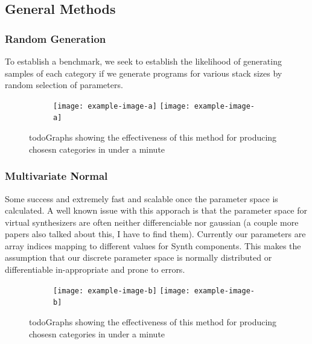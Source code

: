 \documentclass{nime-alternate} %
\begin{document}
\subsection{General Methods}
\subsubsection{Random Generation}
To establish a benchmark, we seek to establish the likelihood of generating samples of each category if we generate programs for various stack sizes by random selection of parameters. \\
\begin{figure}[H]
\centering
\begin{subfigure}[b]{\linewidth}
\texttt{[image: example-image-a]}
\texttt{[image: example-image-a]}
\label{fig:1stack}
\setcounter{subfigure}{2}%
\end{subfigure}
\caption{\colorbox{green!=40}{todo}Graphs showing the effectiveness of this method for producing chosesn categories in under a minute}
\label{fig:rand-graphs}
\end{figure}
\subsubsection{Multivariate Normal}
Some success and extremely fast and scalable once the parameter space is calculated. A well known issue with this apporach is that the parameter space for virtual synthesizers are often neither differenciable nor gaussian \cite{esling2019universal} (a couple more papers also talked about this, I have to find them). Currently our parameters are array indices mapping to different values for Synth components. This makes the assumption that our discrete parameter space is normally distributed or differentiable in-appropriate and prone to errors. \\
\begin{figure}[H]
\centering
\begin{subfigure}[b]{\linewidth}
\texttt{[image: example-image-b]}
\texttt{[image: example-image-b]}
\label{fig:1stack}
\setcounter{subfigure}{2}%
\end{subfigure}
\caption{\colorbox{green!=40}{todo}Graphs showing the effectiveness of this method for producing chosesn categories in under a minute}
\label{fig:multi-graphs}
\end{figure}
\end{document}
